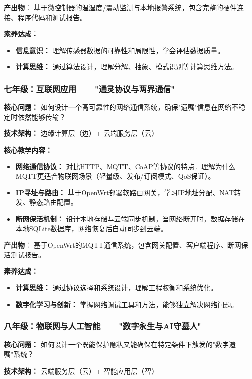 \documentclass[12pt,a4paper,fontset=fandol]{ctexart}
\begin{document}
\textbf{产出物：} 基于微控制器的温湿度/震动监测与本地报警系统，包含完整的硬件连接、程序代码和测试报告。

\textbf{素养达成：} 
\begin{itemize}
    \item \textbf{信息意识：} 理解传感器数据的可靠性和局限性，学会评估数据质量。
    \item \textbf{计算思维：} 通过算法设计，理解分解、抽象、模式识别等计算思维方法。
\end{itemize}

\subsubsection{七年级：互联网应用——"通灵协议与两界通信"}
\textbf{核心问题：} 如何设计一个高可靠性的网络通信系统，确保"遗嘱"信息在网络不稳定时依然能够传输？

\textbf{技术架构：} 边缘计算层（边）+ 云端服务层（云）

\textbf{核心教学内容：}
\begin{itemize}
    \item \textbf{网络通信协议：} 对比HTTP、MQTT、CoAP等协议的特点，理解为什么MQTT更适合物联网场景（轻量级、发布/订阅模式、QoS保证）。
    \item \textbf{IP寻址与路由：} 基于OpenWrt部署软路由网关，学习IP地址分配、NAT转发、静态路由配置。
    \item \textbf{断网保活机制：} 设计本地存储与云端同步机制，当网络断开时，数据存储在本地SQLite数据库，网络恢复后自动同步到云端。
\end{itemize}

\textbf{产出物：} 基于OpenWrt的MQTT通信系统，包含网关配置、客户端程序、断网保活测试报告。

\textbf{素养达成：}
\begin{itemize}
    \item \textbf{计算思维：} 通过协议选择和系统设计，理解工程权衡和系统优化。
    \item \textbf{数字化学习与创新：} 掌握网络调试工具和方法，能够独立解决网络问题。
\end{itemize}

\subsubsection{八年级：物联网与人工智能——"数字永生与AI守墓人"}
\textbf{核心问题：} 如何设计一个既能保护隐私又能确保在特定条件下触发的"数字遗嘱"系统？

\textbf{技术架构：} 云端服务层（云）+ 智能应用层（智）
\end{document}
